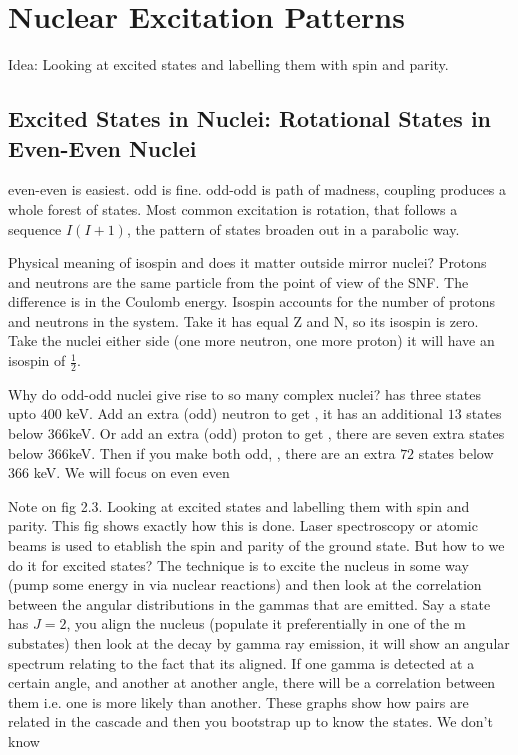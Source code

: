 \newpage
\section{Nuclear Excitation Patterns}
Idea: Looking at excited states and labelling them with spin and parity. 

\subsection{Excited States in Nuclei: Rotational States in Even-Even Nuclei}
even-even is easiest. odd is fine. odd-odd is path of madness, coupling produces a whole forest of states. Most common excitation is rotation, that follows a sequence \(I(I+1)\), the pattern of states broaden out in a parabolic way.

Physical meaning of isospin and does it matter outside mirror nuclei?
Protons and neutrons are the same particle from the point of view of the SNF. The difference is in the Coulomb energy. Isospin accounts for the number of protons and neutrons in the system. Take  it has equal Z and N, so its isospin is zero. Take the nuclei either side (one more neutron, one more proton) it will have an isospin of \(\frac{1}{2}\). 

Why do odd-odd nuclei give rise to so many complex nuclei?  has three states upto \(400\) keV. Add an extra (odd) neutron to get , it has an additional \(13\) states below 366keV. Or add an extra (odd) proton to get , there are seven extra states below 366keV. Then if you make both odd, , there are an extra \(72\) states below 366 keV. We will focus on even even

Note on fig 2.3. Looking at excited states and labelling them with spin and parity. This fig shows exactly how this is done. Laser spectroscopy or atomic beams is used to etablish the spin and parity of the ground state. But how to we do it for excited states? The technique is to excite the nucleus in some way (pump some energy in via nuclear reactions) and then look at the correlation between the angular distributions in the gammas that are emitted. Say a state has \(J=2\), you align the nucleus (populate it preferentially in one of the m substates) then look at the decay by gamma ray emission, it will show an angular spectrum relating to the fact that its aligned. If one gamma is detected at a certain angle, and another at another angle, there will be a correlation between them i.e. one is more likely than another. These graphs show how pairs are related in the cascade and then you bootstrap up to know the states. We don't know 

